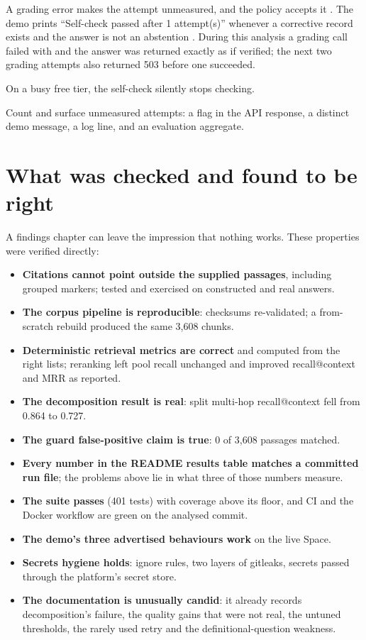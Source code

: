 \begin{description}[style=nextline]
  \item[Evidence] A grading error makes the attempt unmeasured, and the policy accepts it . The demo prints \enquote{Self-check passed after 1 attempt(s)} whenever a corrective record exists and the answer is not an abstention . During this analysis a grading call failed with  and the answer was returned exactly as if verified; the next two grading attempts also returned 503 before one succeeded.
  \item[Impact] On a busy free tier, the self-check silently stops checking.
  \item[Fix] Count and surface unmeasured attempts: a  flag in the API response, a distinct demo message, a log line, and an evaluation aggregate.
\end{description}

\section{What was checked and found to be right}

A findings chapter can leave the impression that nothing works. These properties were verified directly:

\begin{itemize}
  \item \textbf{Citations cannot point outside the supplied passages}, including grouped markers; tested and exercised on constructed and real answers.
  \item \textbf{The corpus pipeline is reproducible}: checksums re-validated; a from-scratch rebuild produced the same 3,608 chunks.
  \item \textbf{Deterministic retrieval metrics are correct} and computed from the right lists; reranking left pool recall unchanged and improved recall@context and MRR as reported.
  \item \textbf{The decomposition result is real}: split multi-hop recall@context fell from 0.864 to 0.727.
  \item \textbf{The guard false-positive claim is true}: 0 of 3,608 passages matched.
  \item \textbf{Every number in the README results table matches a committed run file}; the problems above lie in what three of those numbers measure.
  \item \textbf{The suite passes} (401 tests) with coverage above its floor, and CI and the Docker workflow are green on the analysed commit.
  \item \textbf{The demo's three advertised behaviours work} on the live Space.
  \item \textbf{Secrets hygiene holds}: ignore rules, two layers of gitleaks, secrets passed through the platform's secret store.
  \item \textbf{The documentation is unusually candid}: it already records decomposition's failure, the quality gains that were not real, the untuned thresholds, the rarely used retry and the definitional-question weakness.
\end{itemize}


